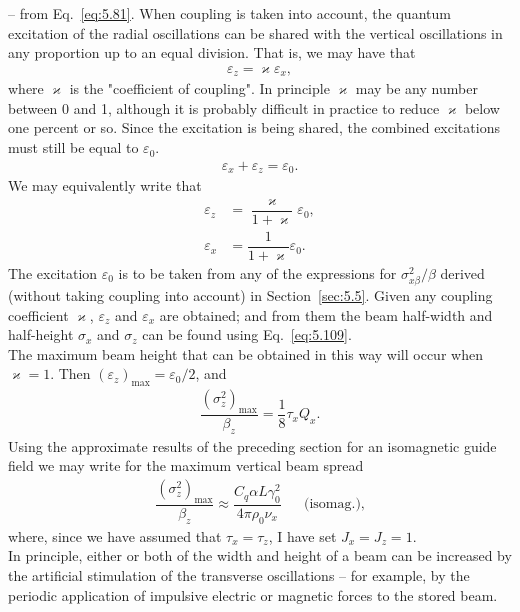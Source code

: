 -- from Eq.~\eqref{eq:5.81}. When coupling is taken into account, the quantum excitation of the radial oscillations can be shared with the vertical oscillations in any proportion up to an equal division. That is, we may have that
\begin{align}
	\varepsilon_z = \varkappa \varepsilon_x,
\end{align}
where $\varkappa$ is the "coefficient of coupling". In principle $\varkappa$ may be any number between
0 and 1, although it is probably difficult in practice to reduce $\varkappa$ below one percent or so. Since the excitation is being shared, the combined excitations must still be equal to $\varepsilon_0$.
\begin{align}
	\varepsilon_x + \varepsilon_z = \varepsilon_0.
\end{align}
We may equivalently write that
\begin{align}
	\varepsilon_z &= \dfrac{\varkappa}{1+\varkappa}\varepsilon_0,\\
    \varepsilon_x &= \dfrac{1}{1+\varkappa}\varepsilon_0.
\end{align}
The excitation $\varepsilon_0$ is to be taken from any of the expressions for $\sigma_{x\beta}^2/\beta$ derived (without taking coupling into account) in Section~\ref{sec:5.5}. Given any coupling coefficient $\varkappa$, $\varepsilon_z$ and $\varepsilon_x$ are obtained; and from them the beam half-width and half-height $\sigma_x$ and $\sigma_z$ can be found using Eq.~\eqref{eq:5.109}.\\
The maximum beam height that can be obtained in this way will occur when $\varkappa = 1$. Then $(\varepsilon_z)_\text{max} = \varepsilon_0/2$, and
\begin{align}
	\dfrac{(\sigma_z^2)_\text{max}}{\beta_z} = \dfrac{1}{8} \tau_x Q_x.
\end{align}
Using the approximate results of the preceding section for an isomagnetic guide field we may write for the maximum vertical beam spread
\begin{align}
	\dfrac{(\sigma_z^2)_\text{max}}{\beta_z} \approx \dfrac{C_q \alpha L \gamma_0^2}{4\pi\rho_0\nu_x} && \text{(isomag.)},
\end{align}
where, since we have assumed that $\tau_x = \tau_z$, I have set $J_x = J_z = 1$.\\
In principle, either or both of the width and height of a beam can be increased by the artificial stimulation of the transverse oscillations -- for example, by the periodic application of impulsive electric or magnetic forces to the stored beam.



